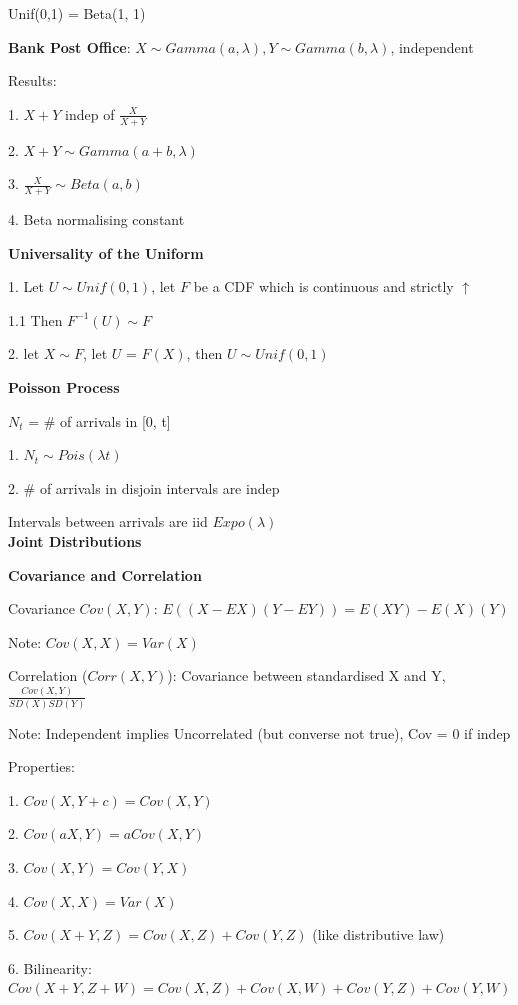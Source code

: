 \documentclass[10pt, a4paper]{article}
\newcommand{\red}[1]{{\color{red}#1}}
\newcommand{\header}[1]{{\normalsize\textbf{#1}}}
\newcommand{\tab}[0]{\hspace*{2mm}}
\begin{document}
\begin{multicols*}{3}
		Unif(0,1) = Beta(1, 1)

		\textbf{Bank Post Office}: $X \sim Gamma(a, \lambda), Y \sim Gamma(b, \lambda)$, independent

		Results: 

		1. $X + Y$ indep of $\frac{X}{X + Y}$

		2. $X + Y \sim Gamma(a + b, \lambda)$

		3. $\frac{X}{X+Y} \sim Beta(a,b)$

		4. Beta normalising constant

		\textbf{Universality of the Uniform}

		1. Let $U \sim Unif(0,1)$, let $F$ be a CDF which is continuous and strictly $\uparrow$
		
		\tab{} 1.1 Then $F^{-1}(U) \sim F$

		2. let $X \sim F$, let $U$ = $F(X)$, then $U \sim Unif(0, 1)$

		\textbf{Poisson Process}

		$N_t$ = \# of arrivals in [0, t]

		1. $N_t \sim Pois (\lambda t)$

		2. \# of arrivals in disjoin intervals are indep

		Intervals \red{between arrivals} are iid $Expo(\lambda)$\\

		\header{Joint Distributions}

		\textbf{Covariance and Correlation}

		Covariance $Cov(X, Y)$: $E((X - EX)(Y - EY)) = E(XY) - E(X)(Y)$
		
		Note: $Cov(X,X) = Var(X)$

		Correlation ($Corr(X,Y)$): Covariance between standardised X and Y, $\frac{Cov(X,Y)}{SD(X)SD(Y)}$

		\red{Note}: Independent implies Uncorrelated (but converse not true), Cov = 0 if indep

		Properties:

		1. $Cov(X, Y + c) = Cov(X,Y)$

		2. $Cov(aX, Y) = aCov(X,Y)$

		3. $Cov(X, Y) = Cov(Y,X)$

		4. $Cov(X, X) = Var(X)$
		
		5. $Cov(X + Y, Z) = Cov(X,Z) + Cov(Y, Z)$ (like distributive law)

		6. Bilinearity: $Cov(X + Y, Z + W) = Cov(X, Z) + Cov(X, W) + Cov(Y, Z) + Cov(Y, W)$



\end{multicols*}
\end{document}
